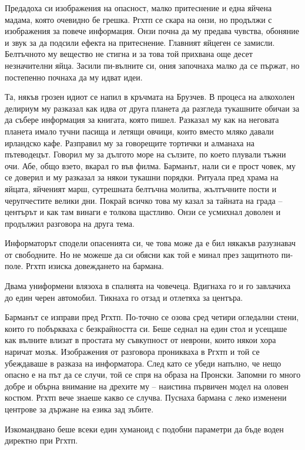 \documentclass[ebook,openany,12pt]{memoir}
\begin{document}
Предадоха си изображения на опасност, малко притеснение и една яйчена мадама, която очевидно бе грешка. Ргхтп се скара на онзи, но продължи с изображения за повече информация. Онзи почна да му предава чувства, обоняние и звук за да подсили ефекта на притеснение. Главният яйцеген се замисли. Белтъчното му вещество не стигна и за това той прихвана още десет незначителни яйца. Засили пи-вълните си, ония започнаха малко да се пържат, но постепенно почнаха да му идват идеи.

Та, някъв грозен идиот се напил в кръчмата на Брузчев. В процеса на алкохолен делириум му разказал как идва от друга планета да разгледа тукашните обичаи за да събере информация за книгата, която пишел. Разказал му как на неговата планета имало тучни пасища и летящи овчици, които вместо мляко давали ирландско кафе. Разправил му за говорещите тортички и алманаха на пътеводецът. Говорил му за дългото море на сълзите, по което плували тъжни очи. Абе, общо взето, вкарал го във филма. Барманът, нали си е прост човек, му се доверил и му разказал за някои тукашни порядки. Ритуала пред храма на яйцата, яйченият марш, сутрешната белтъчна молитва, жълтъчните пости и черупчестите велики дни. Покрай всичко това му казал за тайната на града – центърът и как там винаги е толкова щастливо. Онзи се усмихнал доволен и продължил разговора на друга тема.

Информаторът сподели опасенията си, че това може да е бил някакъв разузнавач от свободните. Но не можеше да си обясни как той е минал през защитното пи-поле. Ргхтп изиска довеждането на бармана.

Двама униформени влязоха в спалнята на човечеца. Вдигнаха го и го завлачиха до един черен автомобил. Тикнаха го отзад и отлетяха за центъра. 

Барманът се изправи пред Ргхтп. По-точно се озова сред четири огледални стени, които го побъркваха с безкрайността си. Беше седнал на един стол и усещаше как вълните влизат в простата му съвкупност от неврони, които някои хора наричат мозък. Изображения от разговора проникваха в Ргхтп и той се убеждаваше в разказа на информатора. След като се убеди напълно, че нещо опасно е на път да се случи, той се спря на образа на Пронски. Запомни го много добре и обърна внимание на дрехите му – наистина първичен модел на оловен костюм. Ргхтп вече знаеше какво се случва. Пуснаха бармана с леко изменени центрове за държане на езика зад зъбите.

Изкомандвано беше всеки един хуманоид с подобни параметри да бъде воден директно при Ргхтп.
\end{document}
